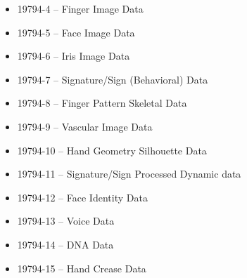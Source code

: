 \documentclass[a4paper]{article}
\begin{document}
\begin{itemize}
\begin{itemize}
\begin{itemize}
            \item 19794-4 -- Finger Image Data
            \item 19794-5 -- Face Image Data
            \item 19794-6 -- Iris Image Data
            \item 19794-7 -- Signature/Sign (Behavioral) Data
            \item 19794-8 -- Finger Pattern Skeletal Data
            \item 19794-9 -- Vascular Image Data
            \item 19794-10 -- Hand Geometry Silhouette Data
            \item 19794-11 -- Signature/Sign Processed Dynamic data
            \item 19794-12 -- Face Identity Data
            \item 19794-13 -- Voice Data
            \item 19794-14 -- DNA Data
            \item 19794-15 -- Hand Crease Data
          \end{itemize}


\end{itemize}
\end{itemize}
\end{document}
